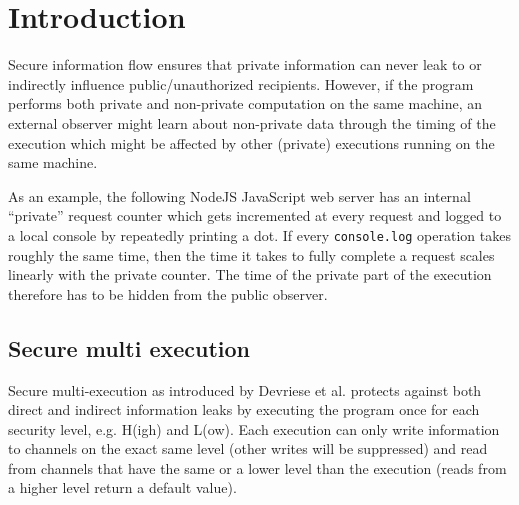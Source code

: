 \documentclass[10pt,preprint]{sigplanconf}
\title{\mytitle}
\begin{document}
\maketitle


\section{Introduction}

Secure information flow ensures that private information can never leak to or indirectly influence public/unauthorized recipients.  However, if the program performs both private and non-private computation on the same machine, an external observer might learn about non-private data through the timing of the execution which might be affected by other (private) executions running on the same machine.

As an example, the following NodeJS JavaScript web server has an internal ``private'' request counter which gets incremented at every request and logged to a local console by repeatedly printing a dot.  If every \verb+console.log+ operation takes roughly the same time, then the time it takes to fully complete a request scales linearly with the private counter.  The time of the private part of the execution therefore has to be hidden from the public observer.

\subsection{Secure multi execution}

Secure multi-execution as introduced by Devriese et al. \cite{devriese2010} protects against both direct and indirect information leaks by executing the program once for each security level, e.g. H(igh) and L(ow).  Each execution can only write information to channels on the exact same level (other writes will be suppressed) and read from channels that have the same or a lower level than the execution (reads from a higher level return a default value).
\end{document}
